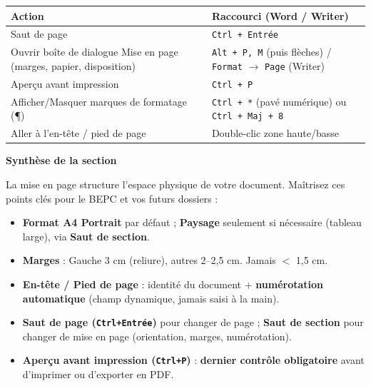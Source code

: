 \documentclass[11pt]{article}
\begin{document}
\begin{exemplebox}
    \begin{center}
    \begin{tabularx}{\linewidth}{|l|X|}
        \hline
        \rowcolor{popblueL}
        \textbf{Action} & \textbf{Raccourci (Word / Writer)} \\
        \hline
        Saut de page & \texttt{Ctrl + Entrée} \\
        \hline
        Ouvrir boîte de dialogue Mise en page (marges, papier, disposition) & \texttt{Alt + P, M} (puis flèches) / \texttt{Format} $\rightarrow$ \texttt{Page} (Writer) \\
        \hline
        Aperçu avant impression & \texttt{Ctrl + P} \\
        \hline
        Afficher/Masquer marques de formatage (¶) & \texttt{Ctrl + *} (pavé numérique) ou \texttt{Ctrl + Maj + 8} \\
        \hline
        Aller à l'en-tête / pied de page & Double-clic zone haute/basse \\
        \hline
    \end{tabularx}
    \end{center}
\end{exemplebox}

\textbf{Synthèse de la section}\par

La mise en page structure l'espace physique de votre document. Maîtrisez ces points clés pour le BEPC et vos futurs dossiers :
\begin{itemize}
    \item \textbf{Format A4 Portrait} par défaut ; \textbf{Paysage} seulement si nécessaire (tableau large), via \textbf{Saut de section}.
    \item \textbf{Marges} : Gauche 3 cm (reliure), autres 2--2,5 cm. Jamais $<$ 1,5 cm.
    \item \textbf{En-tête / Pied de page} : identité du document + \textbf{numérotation automatique} (champ dynamique, jamais saisi à la main).
    \item \textbf{Saut de page (\texttt{Ctrl+Entrée})} pour changer de page ; \textbf{Saut de section} pour changer de mise en page (orientation, marges, numérotation).
    \item \textbf{Aperçu avant impression (\texttt{Ctrl+P})} : \textbf{dernier contrôle obligatoire} avant d'imprimer ou d'exporter en PDF.
\end{itemize}
\end{document}
